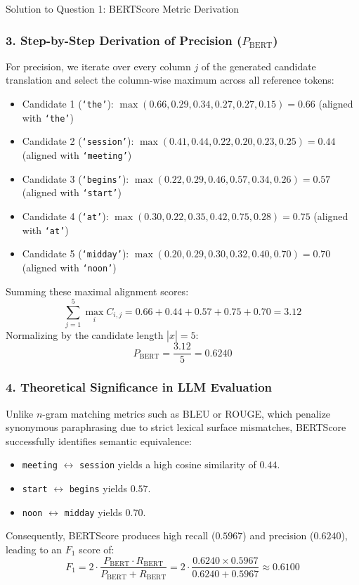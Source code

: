 \documentclass[11pt,a4paper]{article}
\begin{document}
\begin{solutionbox}{Solution to Question 1: BERTScore Metric Derivation}
\subsubsection*{3. Step-by-Step Derivation of Precision ($P_{\text{BERT}}$)}
For precision, we iterate over every column $j$ of the generated candidate translation and select the column-wise maximum across all reference tokens:
\begin{itemize}[leftmargin=1.5cm,itemsep=1pt]
    \item Candidate 1 (\texttt{`the'}): $\max(0.66, 0.29, 0.34, 0.27, 0.27, 0.15) = \mathbf{0.66}$ \quad (aligned with \texttt{`the'})
    \item Candidate 2 (\texttt{`session'}): $\max(0.41, 0.44, 0.22, 0.20, 0.23, 0.25) = \mathbf{0.44}$ \quad (aligned with \texttt{`meeting'})
    \item Candidate 3 (\texttt{`begins'}): $\max(0.22, 0.29, 0.46, 0.57, 0.34, 0.26) = \mathbf{0.57}$ \quad (aligned with \texttt{`start'})
    \item Candidate 4 (\texttt{`at'}): $\max(0.30, 0.22, 0.35, 0.42, 0.75, 0.28) = \mathbf{0.75}$ \quad (aligned with \texttt{`at'})
    \item Candidate 5 (\texttt{`midday'}): $\max(0.20, 0.29, 0.30, 0.32, 0.40, 0.70) = \mathbf{0.70}$ \quad (aligned with \texttt{`noon'})
\end{itemize}
Summing these maximal alignment scores:
\begin{equation*}
    \sum_{j=1}^{5} \max_{i} C_{i,j} = 0.66 + 0.44 + 0.57 + 0.75 + 0.70 = 3.12
\end{equation*}
Normalizing by the candidate length $|\hat{x}| = 5$:
\begin{equation}
    P_{\text{BERT}} = \frac{3.12}{5} = \mathbf{0.6240}
\end{equation}

\subsubsection*{4. Theoretical Significance in LLM Evaluation}
Unlike $n$-gram matching metrics such as BLEU or ROUGE, which penalize synonymous paraphrasing due to strict lexical surface mismatches, BERTScore successfully identifies semantic equivalence:
\begin{itemize}[itemsep=1pt]
    \item \texttt{meeting} $\leftrightarrow$ \texttt{session} yields a high cosine similarity of $0.44$.
    \item \texttt{start} $\leftrightarrow$ \texttt{begins} yields $0.57$.
    \item \texttt{noon} $\leftrightarrow$ \texttt{midday} yields $0.70$.
\end{itemize}
Consequently, BERTScore produces high recall ($0.5967$) and precision ($0.6240$), leading to an $F_1$ score of:
\begin{equation*}
    F_1 = 2 \cdot \frac{P_{\text{BERT}} \cdot R_{\text{BERT}}}{P_{\text{BERT}} + R_{\text{BERT}}} = 2 \cdot \frac{0.6240 \times 0.5967}{0.6240 + 0.5967} \approx 0.6100
\end{equation*}
\end{solutionbox}
\end{document}
